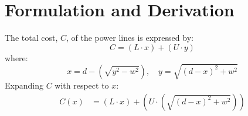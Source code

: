 \documentclass{article}
\begin{document}
\section{Formulation and Derivation}
The total cost, \( C \), of the power lines is expressed by:
\begin{equation}
    C = (L \cdot x) + (U \cdot y)
\end{equation}
where:
\begin{equation}
    x = d - \left(\sqrt{y^2 - w^2}\right),\quad y = \sqrt{\left(d - x\right)^2 + w^2} 
\end{equation}
Expanding \( C \) with respect to \( x \):
\begin{align}
    C(x) &= (L \cdot x) + (U \cdot \left(\sqrt{\left(d - x\right)^2 + w^2}\right)) \\
\end{align}
\end{document}
